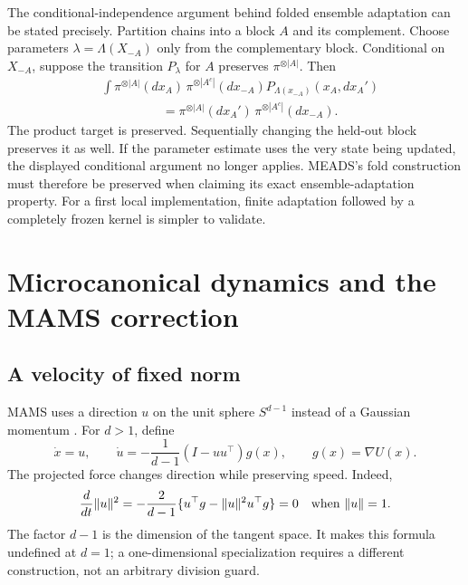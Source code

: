 The conditional-independence argument behind folded ensemble adaptation can
be stated precisely. Partition chains into a block $A$ and its complement.
Choose parameters $\lambda=\Lambda(X_{-A})$ only from the complementary
block. Conditional on $X_{-A}$, suppose the transition $P_\lambda$ for $A$
preserves $\pi^{\otimes |A|}$. Then
\begin{align}
 &\int\pi^{\otimes |A|}(dx_A)\,\pi^{\otimes|A^c|}(dx_{-A})
                P_{\Lambda(x_{-A})}(x_A,dx_A')\\
 &\hspace{2cm}=\pi^{\otimes |A|}(dx_A')\,\pi^{\otimes|A^c|}(dx_{-A}).
 \label{eq:bf-modern-folded-invariance}
\end{align}
The product target is preserved. Sequentially changing the held-out block
preserves it as well. If the parameter estimate uses the very state being
updated, the displayed conditional argument no longer applies. MEADS's
fold construction must therefore be preserved when claiming its exact
ensemble-adaptation property. For a first local implementation, finite
adaptation followed by a completely frozen kernel is simpler to validate.

\section{Microcanonical dynamics and the MAMS correction}
\label{sec:bf-modern-mams}

\subsection{A velocity of fixed norm}

MAMS uses a direction $u$ on the unit sphere $S^{d-1}$ instead of a Gaussian
momentum \citep{robnik2025mams}. For $d>1$, define
\begin{equation}
 \dot x=u,\qquad
 \dot u=-\frac{1}{d-1}(I-uu^\top)g(x),\qquad
 g(x)=\nabla U(x).
 \label{eq:bf-modern-microcanonical-dynamics}
\end{equation}
The projected force changes direction while preserving speed. Indeed,
\begin{equation}
 \frac{d}{dt}\|u\|^2
 =-\frac{2}{d-1}\{u^\top g-\|u\|^2u^\top g\}=0
 \quad\hbox{when }\|u\|=1.
 \label{eq:bf-modern-sphere-norm}
\end{equation}
The factor $d-1$ is the dimension of the tangent space. It makes this formula
undefined at $d=1$; a one-dimensional specialization requires a different
construction, not an arbitrary division guard.

